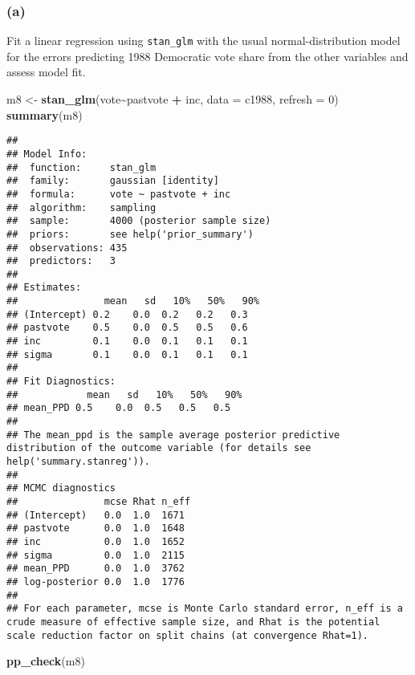 \documentclass[
]{article}
\newenvironment{Shaded}{\begin{snugshade}}{\end{snugshade}}
\newcommand{\AttributeTok}[1]{\textcolor[rgb]{0.13,0.29,0.53}{#1}}
\newcommand{\DecValTok}[1]{\textcolor[rgb]{0.00,0.00,0.81}{#1}}
\newcommand{\FunctionTok}[1]{\textcolor[rgb]{0.13,0.29,0.53}{\textbf{#1}}}
\newcommand{\NormalTok}[1]{#1}
\newcommand{\OtherTok}[1]{\textcolor[rgb]{0.56,0.35,0.01}{#1}}
\newcommand{\SpecialCharTok}[1]{\textcolor[rgb]{0.81,0.36,0.00}{\textbf{#1}}}
\begin{document}
\hypertarget{a-2}{%
\subsubsection{(a)}\label{a-2}}

Fit a linear regression using \texttt{stan\_glm} with the usual
normal-distribution model for the errors predicting 1988 Democratic vote
share from the other variables and assess model fit.

\begin{Shaded}
\begin{Highlighting}[]
\NormalTok{m8 }\OtherTok{\textless{}{-}} \FunctionTok{stan\_glm}\NormalTok{(vote}\SpecialCharTok{\textasciitilde{}}\NormalTok{pastvote }\SpecialCharTok{+}\NormalTok{ inc, }\AttributeTok{data =}\NormalTok{ c1988, }\AttributeTok{refresh =} \DecValTok{0}\NormalTok{) }
\FunctionTok{summary}\NormalTok{(m8)}
\end{Highlighting}
\end{Shaded}

\begin{verbatim}
## 
## Model Info:
##  function:     stan_glm
##  family:       gaussian [identity]
##  formula:      vote ~ pastvote + inc
##  algorithm:    sampling
##  sample:       4000 (posterior sample size)
##  priors:       see help('prior_summary')
##  observations: 435
##  predictors:   3
## 
## Estimates:
##               mean   sd   10%   50%   90%
## (Intercept) 0.2    0.0  0.2   0.2   0.3  
## pastvote    0.5    0.0  0.5   0.5   0.6  
## inc         0.1    0.0  0.1   0.1   0.1  
## sigma       0.1    0.0  0.1   0.1   0.1  
## 
## Fit Diagnostics:
##            mean   sd   10%   50%   90%
## mean_PPD 0.5    0.0  0.5   0.5   0.5  
## 
## The mean_ppd is the sample average posterior predictive distribution of the outcome variable (for details see help('summary.stanreg')).
## 
## MCMC diagnostics
##               mcse Rhat n_eff
## (Intercept)   0.0  1.0  1671 
## pastvote      0.0  1.0  1648 
## inc           0.0  1.0  1652 
## sigma         0.0  1.0  2115 
## mean_PPD      0.0  1.0  3762 
## log-posterior 0.0  1.0  1776 
## 
## For each parameter, mcse is Monte Carlo standard error, n_eff is a crude measure of effective sample size, and Rhat is the potential scale reduction factor on split chains (at convergence Rhat=1).
\end{verbatim}

\begin{Shaded}
\begin{Highlighting}[]
\FunctionTok{pp\_check}\NormalTok{(m8)}
\end{Highlighting}
\end{Shaded}
\end{document}
